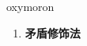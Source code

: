 
\begin{frame}
{\huge oxymoron}
\begin{center}
\begin{enumerate}\Large
  \item \textbf{矛盾修饰法}
\end{enumerate}
\end{center}
\end{frame}
